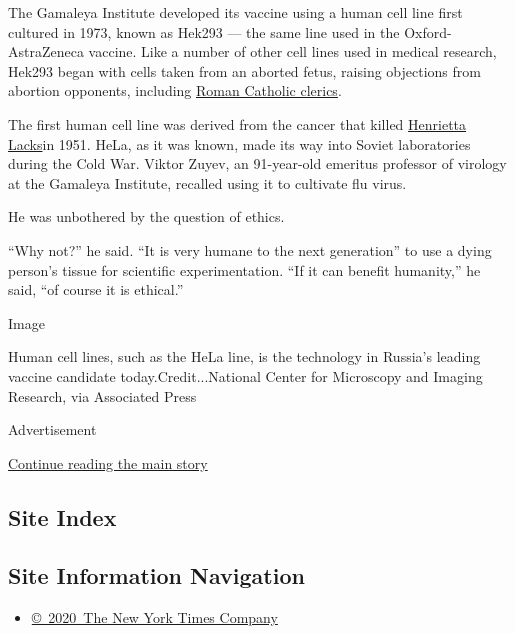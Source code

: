 The Gamaleya Institute developed its vaccine using a human cell line
first cultured in 1973, known as Hek293 --- the same line used in the
Oxford-AstraZeneca vaccine. Like a number of other cell lines used in
medical research, Hek293 began with cells taken from an aborted fetus,
raising objections from abortion opponents, including
\href{https://www.sciencemag.org/sites/default/files/Canada-COVID-19\%20Vaccine\%20letter\%20May\%2021st\%202020_updated\%20\%28002\%29.pdf}{Roman
Catholic clerics}.

The first human cell line was derived from the cancer that killed
\href{https://www.nytimes.com/2013/08/08/science/after-decades-of-research-henrietta-lacks-family-is-asked-for-consent.html}{Henrietta
Lacks}in 1951. HeLa, as it was known, made its way into Soviet
laboratories during the Cold War. Viktor Zuyev, an 91-year-old emeritus
professor of virology at the Gamaleya Institute, recalled using it to
cultivate flu virus.

He was unbothered by the question of ethics.

``Why not?'' he said. ``It is very humane to the next generation'' to
use a dying person's tissue for scientific experimentation. ``If it can
benefit humanity,'' he said, ``of course it is ethical.''

Image

Human cell lines, such as the HeLa line, is the technology in Russia's
leading vaccine candidate today.Credit...National Center for Microscopy
and Imaging Research, via Associated Press

Advertisement

\protect\hyperlink{after-bottom}{Continue reading the main story}

\hypertarget{site-index}{%
\subsection{Site Index}\label{site-index}}

\hypertarget{site-information-navigation}{%
\subsection{Site Information
Navigation}\label{site-information-navigation}}

\begin{itemize}
\tightlist
\item
  \href{https://help.nytimes.com/hc/en-us/articles/115014792127-Copyright-notice}{©~2020~The
  New York Times Company}
\end{itemize}

